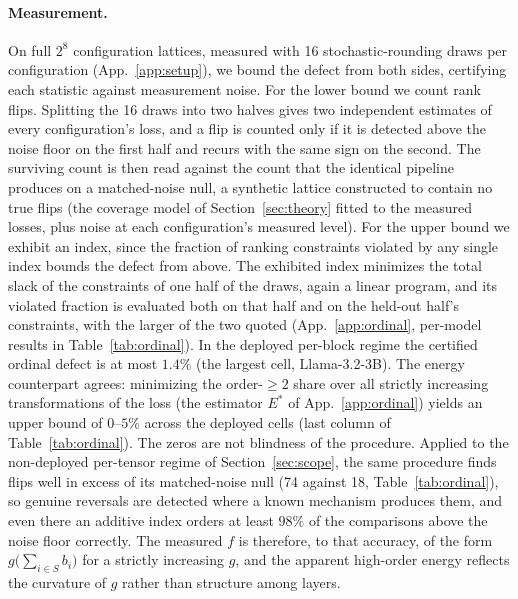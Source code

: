 \paragraph{Measurement.} On full $2^8$ configuration lattices, measured with 16 stochastic-rounding
draws per configuration (App.~\ref{app:setup}), we bound the defect from both sides, certifying each
statistic against measurement noise. For the lower bound we count rank flips. Splitting the 16 draws
into two halves gives two independent estimates of every configuration's loss, and a flip is counted
only if it is detected above the noise floor on the first half and recurs with the same sign on the second. The surviving
count is then read against the count that the identical pipeline produces on a matched-noise null, a
synthetic lattice constructed to contain no true flips (the coverage model of Section~\ref{sec:theory} fitted
to the measured losses, plus noise at each configuration's measured level). For the upper bound we
exhibit an index, since the fraction of ranking
constraints violated by any single index bounds the defect from above. The exhibited index minimizes the total
slack of the constraints of one half of the draws, again a linear program, and its violated fraction is
evaluated both on that half and on the held-out half's constraints, with the larger of the two quoted
(App.~\ref{app:ordinal}, per-model results in
Table~\ref{tab:ordinal}).
In the deployed per-block regime the certified ordinal defect is
at most $1.4\%$ (the largest cell, Llama-3.2-3B). The energy counterpart agrees: minimizing the order-$\ge 2$
share over all strictly increasing transformations of the loss (the estimator $E^*$ of
App.~\ref{app:ordinal}) yields an upper bound of $0$--$5\%$
across the deployed cells (last column of Table~\ref{tab:ordinal}). The zeros are not blindness of the procedure. Applied to the non-deployed
per-tensor regime of Section~\ref{sec:scope}, the same procedure finds flips well in excess of its
matched-noise null (74 against 18, Table~\ref{tab:ordinal}), so genuine reversals are detected where a
known mechanism produces them, and even there an additive
index orders at least $98\%$ of the comparisons above the noise floor correctly. 
The measured
$f$ is therefore, to that accuracy, of the form $g\bigl(\sum_{i\in S} b_i\bigr)$ for a strictly increasing $g$, and
the apparent high-order energy reflects the curvature of $g$ rather than structure among layers.



